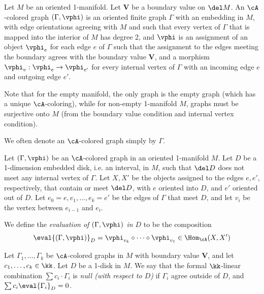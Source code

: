 \documentclass[12pt]{article}
\newcommand{\VV}{{\mathbf{V}}}
\begin{document}
\begin{definition}
\label{d:A-colored-graph}
Let $M$ be an oriented 1-manifold.
Let $\VV$ be a boundary value on $\del M$.
An $\cA$-colored graph $(\Gamma,\vphi)$
is an oriented finite graph $\Gamma$ with an embedding in $M$,
with edge orientations agreeing with $M$
and such that every vertex of $\Gamma$
that is mapped into the interior of $M$
has degree 2,
and $\vphi$ is an assignment of an object $\vphi_e$
for each edge $e$ of $\Gamma$
such that the assignment to the edges meeting the boundary
agrees with the boundary value $\VV$,
and a morphism $\vphi_v: \vphi_e \to \vphi_{e'}$
for every internal vertex of $\Gamma$
with an incoming edge $e$ and outgoing edge $e'$.
\end{definition}

Note that for the empty manifold, the only graph is the empty graph
(which has a unique $\cA$-coloring),
while for non-empty 1-manifold $M$,
graphs must be surjective onto $M$
(from the boundary value condition and internal vertex condition).

We often denote an $\cA$-colored graph simply by $\Gamma$.

\begin{definition}
\label{d:local-ev}
Let $(\Gamma,\vphi)$ be an $\cA$-colored graph
in an oriented 1-manifold $M$.
Let $D$ be a 1-dimension embedded disk, i.e. an interval,
in $M$, such that $\del D$ does not meet any internal vertex
of $\Gamma$.
Let $X,X'$ be the objects assigned to the edges $e,e'$,
respectively, that contain or meet $\del D$,
with $e$ oriented into $D$, and $e'$ oriented out of $D$.
Let $e_0 = e, e_1,\ldots,e_k = e'$ be the edges
of $\Gamma$ that meet $D$, and let
$v_i$ be the vertex between $e_{i-1}$ and $e_i$.

We define the \emph{evaluation of $(\Gamma,\vphi)$ in $D$}
to be the composition
\[
\eval{(\Gamma,\vphi)}_D
= \vphi_{v_k} \circ \cdots \circ \vphi_{v_1}
\in \Hom_\cA(X,X')
\]
\end{definition}


\begin{definition}
\label{d:null-graph}
Let $\Gamma_1,\ldots,\Gamma_k$ be $\cA$-colored graphs in $M$
with boundary value $\VV$,
and let $c_1,\ldots,c_k \in \kk$.
Let $D$ be a 1-disk in $M$.
We say that the formal $\kk$-linear combination
$\sum c_i \cdot \Gamma_i$ is
\emph{null (with respect to $D$)}
if $\Gamma_i$ agree outside of $D$,
and $\sum c_i \eval{\Gamma_i}_D = 0$.
\end{definition}
\end{document}
